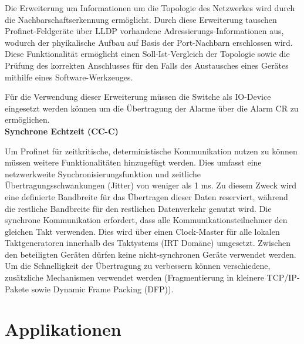 Die Erweiterung um Informationen um die Topologie des Netzwerkes wird durch die Nachbarschaftserkennung ermöglicht. Durch diese Erweiterung tauschen Profinet-Feldgeräte über LLDP vorhandene Adressierungs-Informationen aus, wodurch der phyikalische Aufbau auf Basis der Port-Nachbarn erschlossen wird. Diese Funktionalität ermöglicht einen Soll-Ist-Vergleich der Topologie sowie die Prüfung des korrekten Anschlusses für den Falls des Austausches eines Gerätes mithilfe eines Software-Werkzeuges. 

Für die Verwendung dieser Erweiterung müssen die Switche als IO-Device eingesetzt werden können um die Übertragung der Alarme über die Alarm CR zu ermöglichen. \\


\textbf{Synchrone Echtzeit (CC-C)}


Um Profinet für zeitkritische, deterministische Kommunikation nutzen zu können müssen weitere Funktionalitäten hinzugefügt werden. Dies umfasst eine netzwerkweite Synchronisierungsfunktion und zeitliche Übertragungsschwankungen (\glqq Jitter\grqq ) von weniger als 1 ms. Zu diesem Zweck wird eine definierte Bandbreite für das Übertragen dieser Daten reserviert, während die restliche Bandbreite für den restlichen Datenverkehr genutzt wird. Die synchrone Kommunikation erfordert, dass alle Kommunikationsteilnehmer den gleichen Takt verwenden. Dies wird über einen Clock-Master für alle lokalen Taktgeneratoren innerhalb des Taktystems (IRT Domäne) umgesetzt. Zwischen den beteiligten Geräten dürfen keine nicht-synchronen Geräte verwendet werden. Um die Schnelligkeit der Übertragung zu verbessern können verschiedene, zusätzliche Mechanismen verwendet werden (Fragmentierung in kleinere TCP/IP-Pakete sowie Dynamic Frame Packing (DFP)). 


\section{Applikationen}
